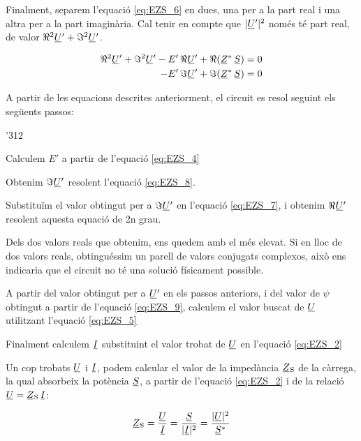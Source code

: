 Finalment, separem l'equació \eqref{eq:EZS_6} en dues, una per a la part real i una altra per a la part imaginària. Cal tenir en compte que $|\cmplx{U}'|^2$ només té part real, de valor $\Re^2\cmplx{U}' + \Im^2\cmplx{U}'$.

\begin{align}
   \Re^2\cmplx{U}' + \Im^2\cmplx{U}' - E' \, \Re\cmplx{U}' + \Re(\cmplx{Z}^* \, \cmplx{S}) &= 0 \label{eq:EZS_7} \\
   - E' \, \Im\cmplx{U}' + \Im(\cmplx{Z}^* \, \cmplx{S}) &= 0 \label{eq:EZS_8}
\end{align}

A partir de les equacions descrites anteriorment, el circuit es resol seguint els següents passos:
\begin{dingautolist}{'312}
   \item Calculem $E'$ a partir de l'equació \eqref{eq:EZS_4}
   \item Obtenim $\Im\cmplx{U}'$ resolent l'equació \eqref{eq:EZS_8}.
   \item Substituïm el valor obtingut per a $\Im\cmplx{U}'$ en l'equació \eqref{eq:EZS_7}, i obtenim $\Re\cmplx{U}'$ resolent aquesta equació de 2n grau.
   \item Dels dos valors reals que obtenim, ens quedem amb el més elevat. Si en lloc de dos valors reals, obtinguéssim un parell de valors conjugats complexos, això ens indicaria que el circuit no té una solució físicament possible.
   \item A partir del valor  obtingut per a $\cmplx{U}'$ en els passos anteriors, i del valor de $\psi$ obtingut a partir de l'equació \eqref{eq:EZS_9}, calculem el valor buscat de $\cmplx{U}$ utilitzant l'equació \eqref{eq:EZS_5}
   \item Finalment calculem $\cmplx{I}$ substituint el valor trobat de $\cmplx{U}$ en l'equació \eqref{eq:EZS_2}
\end{dingautolist}

Un cop trobats $\cmplx{U}$ i $\cmplx{I}$, podem calcular el valor de
la impedància  $\cmplx{Z}\ped{S}$ de la càrrega, la qual absorbeix
la potència $\cmplx{S}$, a partir de l'equació \eqref{eq:EZS_2} i de
la relació $\cmplx{U} = \cmplx{Z}\ped{S} \,\cmplx{I}$:

\begin{equation}
   \cmplx{Z}\ped{S} = \frac{\cmplx{U}}{\cmplx{I}} =
   \frac{\cmplx{S}}{|\cmplx{I}|^2} =
   \frac{|\cmplx{U}|^2}{\cmplx{S}^*} \label{eq:EZS 10}
\end{equation}


